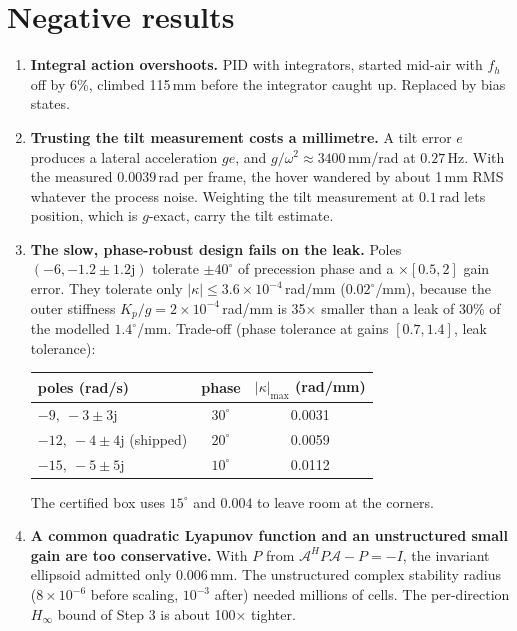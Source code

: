 \documentclass[11pt]{article}
\newcommand{\jj}{\mathrm{j}}
\begin{document}
\section{Negative results}
\label{sec:negative}
\begin{enumerate}[leftmargin=*]
\item \textbf{Integral action overshoots.} PID with integrators, started mid-air with $f_h$ off by
  6\%, climbed 115\,mm before the integrator caught up. Replaced by bias states.
\item \textbf{Trusting the tilt measurement costs a millimetre.} A tilt error $e$ produces a lateral
  acceleration $ge$, and $g/\omega^2\approx 3400$\,mm/rad at $0.27$\,Hz. With the measured
  $0.0039$\,rad per frame, the hover wandered by about 1\,mm RMS whatever the process noise. Weighting
  the tilt measurement at $0.1$\,rad lets position, which is $g$-exact, carry the tilt estimate.
\item \textbf{The slow, phase-robust design fails on the leak.} Poles $(-6,-1.2\pm1.2\jj)$ tolerate
  $\pm40^\circ$ of precession phase and a $\times[0.5,2]$ gain error. They tolerate only
  $|\kappa|\le3.6\times10^{-4}$\,rad/mm ($0.02^\circ$/mm), because the outer stiffness
  $K_p/g=2\times10^{-4}$\,rad/mm is 35$\times$ smaller than a leak of 30\% of the modelled
  $1.4^\circ$/mm. Trade-off (phase
  tolerance at gains $[0.7,1.4]$, leak tolerance):
  \begin{center}\begin{tabular}{lcc}
  \toprule poles (rad/s) & phase & $|\kappa|_{\max}$ (rad/mm) \\ \midrule
  $-9,\ -3\pm3\jj$ & $30^\circ$ & 0.0031 \\
  $-12,\ -4\pm4\jj$ (shipped) & $20^\circ$ & 0.0059 \\
  $-15,\ -5\pm5\jj$ & $10^\circ$ & 0.0112 \\ \bottomrule
  \end{tabular}\end{center}
  The certified box uses $15^\circ$ and $0.004$ to leave room at the corners.
\item \textbf{A common quadratic Lyapunov function and an unstructured small gain are too
  conservative.} With $P$ from $\mathcal A^HP\mathcal A-P=-I$, the invariant ellipsoid admitted only
  $0.006$\,mm. The unstructured complex stability radius ($8\times10^{-6}$ before scaling,
  $10^{-3}$ after) needed millions of cells. The per-direction $H_\infty$ bound of Step 3 is about
  100$\times$ tighter.
\end{enumerate}
\end{document}
